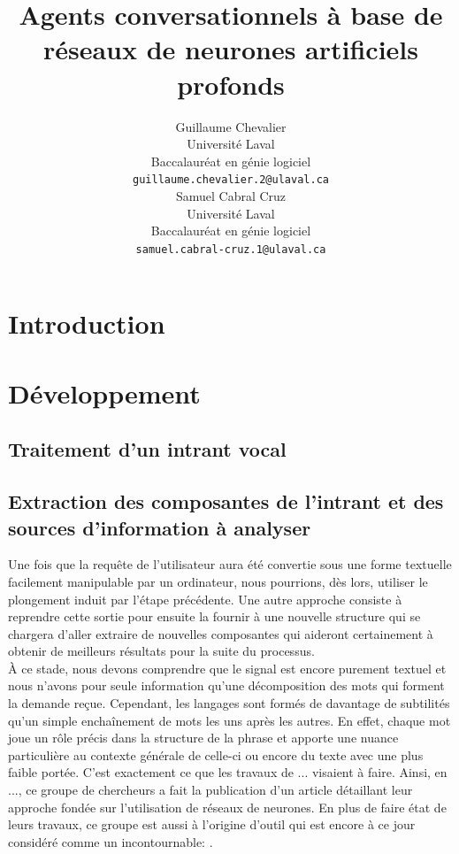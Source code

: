 \documentclass[11pt]{article}
\title{Agents conversationnels à base de réseaux de neurones artificiels profonds}
\author{Guillaume Chevalier \\
  Université Laval \\ Baccalauréat en génie logiciel \\
  {\tt \small guillaume.chevalier.2@ulaval.ca} \\\And
  Samuel Cabral Cruz \\
  Université Laval \\ Baccalauréat en génie logiciel \\
  {\tt \small samuel.cabral-cruz.1@ulaval.ca}}
\date{}
\begin{document}
\maketitle

\begin{abstract}

\end{abstract}

\section{Introduction}


\section{Développement}
\subsection{Traitement d'un intrant vocal}

\subsection{Extraction des composantes de l'intrant et des sources d'information à analyser}
Une fois que la requête de l'utilisateur aura été convertie sous une forme textuelle facilement manipulable par un ordinateur, nous pourrions, dès lors, utiliser le plongement induit par l'étape précédente. Une autre approche consiste à reprendre cette sortie pour ensuite la fournir à une nouvelle structure qui se chargera d'aller extraire de nouvelles composantes qui aideront certainement à obtenir de meilleurs résultats pour la suite du processus. \\

À ce stade, nous devons comprendre que le signal est encore purement textuel et nous n'avons pour seule information qu'une décomposition des mots qui forment la demande reçue. Cependant, les langages sont formés de davantage de subtilités qu'un simple enchaînement de mots les uns après les autres. En effet, chaque mot joue un rôle précis dans la structure de la phrase et apporte une nuance particulière au contexte générale de celle-ci ou encore du texte avec une plus faible portée. C'est exactement ce que les travaux de ... visaient à faire. Ainsi, en ..., ce groupe de chercheurs a fait la publication d'un article détaillant leur approche fondée sur l'utilisation de réseaux de neurones. En plus de faire état de leurs travaux, ce groupe est aussi à l'origine d'outil qui est encore à ce jour considéré comme un incontournable: \cite{word2vec}. \\
\end{document}
